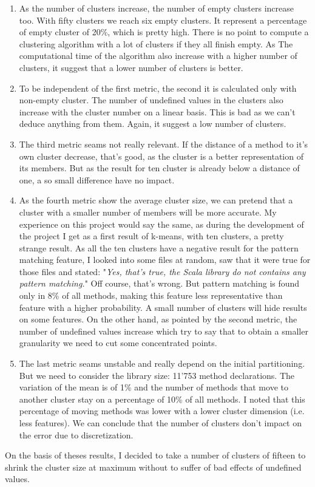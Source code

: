 \documentclass[12pt]{article}
\begin{document}
\begin{enumerate}
\item As the number of clusters increase, the number of empty clusters increase too. With fifty clusters we reach six empty clusters. It represent a percentage of empty cluster of 20\%, which is pretty high. There is no point to compute a clustering algorithm with a lot of clusters if they all finish empty. As The computational time of the algorithm also increase with a higher number of clusters, it suggest that a lower number of clusters is better.
\item To be independent of the first metric, the second it is calculated only with non-empty cluster. The number of undefined values in the clusters also increase with the cluster number on a linear basis. This is bad as we can't deduce anything from them. Again, it suggest a low number of clusters.
\item The third metric seams not really relevant. If the distance of a method to it's own cluster decrease, that's good, as the cluster is a better representation of its members. But as the result for ten cluster is already below a distance of one, a so small difference have no impact.
\item As the fourth metric show the average cluster size, we can pretend that a cluster with a smaller number of members will be more accurate. My experience on this project would say the same, as during the development of the project I get as a first result of k-means, with ten clusters, a pretty strange result. As all the ten clusters have a negative result for the pattern matching feature, I looked into some files at random, saw that it were true for those files and stated: "\textit{Yes, that's true, the Scala library do not contains any pattern matching.}" Off course, that's wrong. But pattern matching is found only in 8\% of all methods, making this feature less representative than feature with a higher probability. A small number of clusters will hide results on some features. On the other hand, as pointed by the second metric, the number of undefined values increase which try to say that to obtain a smaller granularity we need to cut some concentrated points.
\item The last metric seams unstable and really depend on the initial partitioning. But we need to consider the library size: 11'753 method declarations. The variation of the mean is of 1\% and the number of methods that move to another cluster stay on a percentage of 10\% of all methods. I noted that this percentage of moving methods was lower with a lower cluster dimension (i.e. less features). We can conclude that the number of clusters don't impact on the error due to discretization.
\end{enumerate}
On the basis of theses results, I decided to take a number of clusters of fifteen to shrink the cluster size at maximum without to suffer of bad effects of undefined values.
\end{document}
